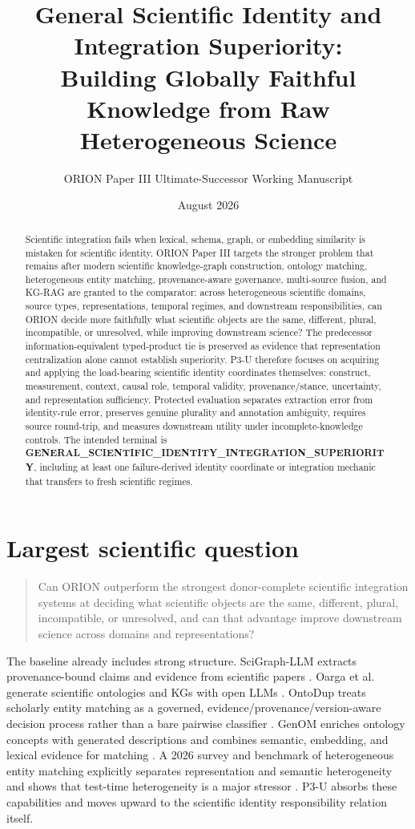 \documentclass[11pt]{article}
\title{General Scientific Identity and Integration Superiority:\\
Building Globally Faithful Knowledge from Raw Heterogeneous Science}
\author{ORION Paper III Ultimate-Successor Working Manuscript}
\date{August 2026}
\begin{document}
\maketitle

\begin{abstract}
Scientific integration fails when lexical, schema, graph, or embedding similarity is mistaken for scientific identity. ORION Paper III targets the stronger problem that remains after modern scientific knowledge-graph construction, ontology matching, heterogeneous entity matching, provenance-aware governance, multi-source fusion, and KG-RAG are granted to the comparator: across heterogeneous scientific domains, source types, representations, temporal regimes, and downstream responsibilities, can ORION decide more faithfully what scientific objects are the same, different, plural, incompatible, or unresolved, while improving downstream science? The predecessor information-equivalent typed-product tie is preserved as evidence that representation centralization alone cannot establish superiority. P3-U therefore focuses on acquiring and applying the load-bearing scientific identity coordinates themselves: construct, measurement, context, causal role, temporal validity, provenance/stance, uncertainty, and representation sufficiency. Protected evaluation separates extraction error from identity-rule error, preserves genuine plurality and annotation ambiguity, requires source round-trip, and measures downstream utility under incomplete-knowledge controls. The intended terminal is \textbf{GENERAL\_SCIENTIFIC\_IDENTITY\_INTEGRATION\_SUPERIORITY}, including at least one failure-derived identity coordinate or integration mechanic that transfers to fresh scientific regimes.
\end{abstract}

\section{Largest scientific question}
\begin{quote}
Can ORION outperform the strongest donor-complete scientific integration systems at deciding what scientific objects are the same, different, plural, incompatible, or unresolved, and can that advantage improve downstream science across domains and representations?
\end{quote}

The baseline already includes strong structure. SciGraph-LLM extracts provenance-bound claims and evidence from scientific papers \cite{scigraphllm2026}. Oarga et al. generate scientific ontologies and KGs with open LLMs \cite{oarga2026}. OntoDup treats scholarly entity matching as a governed, evidence/provenance/version-aware decision process rather than a bare pairwise classifier \cite{ontodup2026}. GenOM enriches ontology concepts with generated descriptions and combines semantic, embedding, and lexical evidence for matching \cite{genom2026}. A 2026 survey and benchmark of heterogeneous entity matching explicitly separates representation and semantic heterogeneity and shows that test-time heterogeneity is a major stressor \cite{heterogeneity2026}. P3-U absorbs these capabilities and moves upward to the scientific identity responsibility relation itself.
\end{document}

